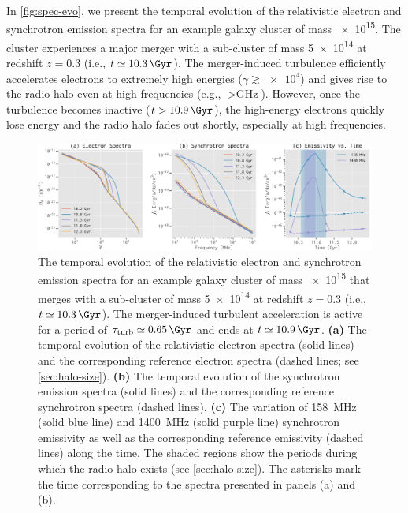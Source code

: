 \documentclass[twocolumn]{aastex62}
\newcommand{\R}[1]{\mathrm{#1}}
\newcommand{\editone}[1]{{\leavevmode\color{cyan}#1}}
\begin{document}
\editone{%
In \autoref{fig:spec-evo}, we present the temporal evolution of the
relativistic electron and synchrotron emission spectra for an example
galaxy cluster of mass \SI{e15}{\solarmass}.
The cluster experiences a major merger with a sub-cluster of mass
\SI{5e14}{\solarmass} at redshift $z = 0.3$
(i.e., $t \simeq \SI{10.3}{\Gyr}$).
The merger-induced turbulence efficiently accelerates electrons to
extremely high energies ($\gamma \gtrsim \num{e4}$) and gives rise to the
radio halo even at high frequencies (e.g., $> \si{\GHz}$).
However, once the turbulence becomes inactive ($t > \SI{10.9}{\Gyr}$), the
high-energy electrons quickly lose energy and the radio halo fades out
shortly, especially at high frequencies.
}

\begin{figure}
  \centering
  \includegraphics[width=\textwidth]{spec-evo-example}
  \caption{\label{fig:spec-evo}\editone{%
    The temporal evolution of the relativistic electron and synchrotron
    emission spectra for an example galaxy cluster of mass
    \SI{e15}{\solarmass} that merges with a sub-cluster of mass
    \SI{5e14}{\solarmass} at redshift $z = 0.3$
    (i.e., $t \simeq \SI{10.3}{\Gyr}$).
    The merger-induced turbulent acceleration is active for a period of
    $\tau_{\R{turb}} \simeq \SI{0.65}{\Gyr}$ and ends at
    $t \simeq \SI{10.9}{\Gyr}$.
    \textbf{(a)} The temporal evolution of the relativistic electron
    spectra (solid lines) and the corresponding reference electron spectra
    (dashed lines; see \autoref{sec:halo-size}).
    \textbf{(b)} The temporal evolution of the synchrotron emission spectra
    (solid lines) and the corresponding reference synchrotron spectra
    (dashed lines).
    \textbf{(c)} The variation of \SI{158}{\MHz} (solid blue line) and
    \SI{1400}{\MHz} (solid purple line) synchrotron emissivity as well as
    the corresponding reference emissivity (dashed lines) along the time.
    The shaded regions show the periods during which the radio halo exists
    (see \autoref{sec:halo-size}).
    The asterisks mark the time corresponding to the spectra presented in
    panels (a) and (b).
  }}
\end{figure}
\end{document}
